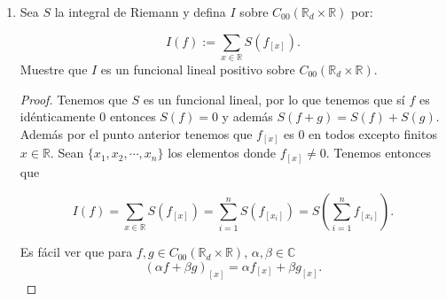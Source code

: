 \documentclass[letter,twoside,12pt]{article}
\numberwithin{equation}{section}
\begin{document}
\begin{enumerate}[label = (\textbf{\arabic*.})]
\begin{enumerate}[label = (\textbf{\roman*.})]
\begin{proof}
\begin{proof}
Para la otra implicación tómese un conjunto $A \subseteq X $ de cardinalidad infinita. La colección de singletons de los elementos de $ A $ es una cobertura abierta de $A$ que no tiene subcobertura finita pues si retiramos un solo singleton de la colección dejaríamos de cubrir el elemento correspondiente. Por lo tanto la condición que $K $ sea finito es necesaria para que $K$ sea compacto.
\end{proof}

Tómese cualquier función $f$ con soporte compacto y sea $K$ el conjunto compacto correspondiente. Por un teorema de topología (ver \cite[Teorema 26.5]{munkres}) tenemos que la imagen de $K$ bajo una función continua es compacta. Por lo tanto, si $ \pi_1$ y $\pi_2 $ son las proyecciones de $\mathbb{R}_d \times \mathbb{R} $ a $ \mathbb{R}_d $ y $ \mathbb{R} $ respectivamente tenemos que $ \pi_1(K) $ y $ \pi_2(K) $ son compactos y por lo tanto $ \pi_1(K) \times \pi_2(K) $ (ver nuevamente \cite[Teorema 26.7]{munkres}). Adicionalmente por el \textbf{\autoref{le:dcompacto}} sabemos que $ \pi_1(K)$ es finito. Tenemos que $ K \subseteq \pi_1(K) \times \pi_2(K)$. Luego como $f$ es de soporte compacto tenemos que para cualquier $x \not \in \pi_1(K)$, $f_{[x]}(y)= f(x,y) = 0$ para cualquier $y \in \mathbb{R}$. Así que probamos que $ f_{[x]} $ es idénticamente 0 para cofinitos $x \in \mathbb{R}$.
\end{proof}
\item Sea $ S $ la integral de Riemann y defina $ I $ sobre $ C_{00}(\mathbb{R}_d \times \mathbb{R}) $ por:

$$ I(f) := \sum_{x \in \mathbb{R}}S(f_{[x]}). $$
Muestre que $ I $ es un funcional lineal positivo sobre $ C_{00}(\mathbb{R}_d \times \mathbb{R}) $.

\begin{proof}
Tenemos que $S $ es un funcional lineal, por lo que tenemos que sí $f$ es idénticamente 0 entonces $S(f)=0 $ y además $ S(f+g)= S(f)+S(g)$. Además por el punto anterior tenemos que $f_{[x]}$ es 0 en todos excepto finitos $x \in \mathbb{R}$. Sean $ \{x_1, x_2, \cdots, x_n\} $ los elementos donde $f_{[x]} \not = 0$. Tenemos entonces que

\begin{equation*}
	I(f) = \sum_{x \in \mathbb{R}}S(f_{[x]} ) = \sum_{i=1 }^n S(f_{[x_i]}) = S(\sum_{i=1 }^n f_{[x_i]}).
\end{equation*}

Es fácil ver que para $ f,g \in C_{00}(\mathbb{R}_d \times \mathbb{R})$, $\alpha, \beta \in \mathbb{C} $ 
$$ (\alpha f+\beta g)_{[x]} = \alpha f_{[x]} + \beta g_{[x]}. $$


\end{proof}
\end{enumerate}
\end{enumerate}
\end{document}
